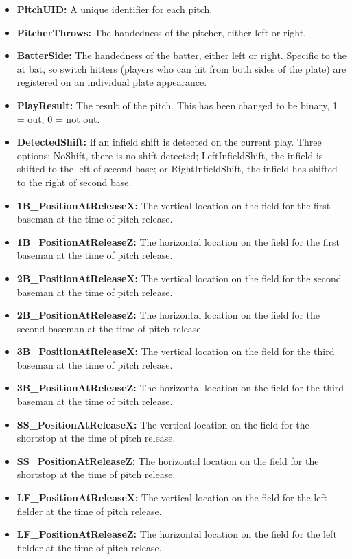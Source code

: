 \documentclass{article}
\begin{document}
\begin{itemize}
    \item \textbf{PitchUID:} A unique identifier for each pitch. 
    \item \textbf{PitcherThrows:} The handedness of the pitcher, either left or right.
    \item \textbf{BatterSide:} The handedness of the batter, either left or right. Specific to the at bat, so switch hitters (players who can hit from both sides of the plate) are registered on an individual plate appearance.
    \item \textbf{PlayResult:} The result of the pitch. This has been changed to be binary, 1 = out, 0 = not out.
    \item \textbf{DetectedShift:} If an infield shift is detected on the current play. Three options: NoShift, there is no shift detected; LeftInfieldShift, the infield is shifted to the left of second base; or RightInfieldShift, the infield has shifted to the right of second base.
    \item \textbf{1B\_PositionAtReleaseX:} The vertical location on the field for the first baseman at the time of pitch release.
    \item \textbf{1B\_PositionAtReleaseZ:} The horizontal location on the field for the first baseman at the time of pitch release.
    \item \textbf{2B\_PositionAtReleaseX:} The vertical location on the field for the second baseman at the time of pitch release.
    \item \textbf{2B\_PositionAtReleaseZ:} The horizontal location on the field for the second baseman at the time of pitch release.
    \item \textbf{3B\_PositionAtReleaseX:} The vertical location on the field for the third baseman at the time of pitch release.
    \item \textbf{3B\_PositionAtReleaseZ:} The horizontal location on the field for the third baseman at the time of pitch release.
    \item \textbf{SS\_PositionAtReleaseX:} The vertical location on the field for the shortstop at the time of pitch release.
    \item \textbf{SS\_PositionAtReleaseZ:} The horizontal location on the field for the shortstop at the time of pitch release.
    \item \textbf{LF\_PositionAtReleaseX:} The vertical location on the field for the left fielder at the time of pitch release.
    \item \textbf{LF\_PositionAtReleaseZ:} The horizontal location on the field for the left fielder at the time of pitch release.

\end{itemize}
\end{document}
